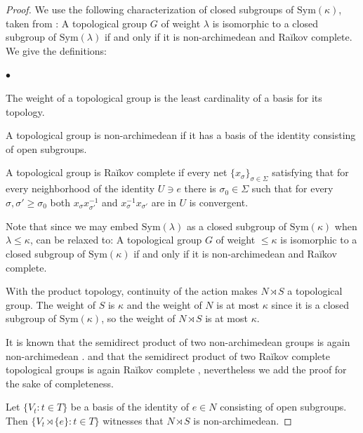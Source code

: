 \documentclass[10pt,a4paper]{amsart}
\theoremstyle{plain}
\theoremstyle{definition}
\begin{document}
\begin{proof}
    We use the following characterization of closed subgroups of $\mathrm{Sym}(\kappa)$, taken from \cite[Corollary 4.9]{ClosedofSym}: A topological group $G$ of weight $\lambda$ is isomorphic to a closed subgroup of $\mathrm{Sym}(\lambda)$ if and only if it is non-archimedean and Ra\u{i}kov complete. We give the definitions:
    \begin{list}{$\bullet$}{}
        \item The weight of a topological group is the least cardinality of a basis for its topology.
        \item A topological group is non-archimedean if it has a basis of the identity consisting of open subgroups.
        \item A topological group is Ra\u{i}kov complete if every net $\{x_\sigma\}_{\sigma\in \Sigma}$ satisfying that for every neighborhood of the identity $U\ni e$ there is $\sigma_0\in \Sigma$ such that for every $\sigma,\sigma'\geq \sigma_0$ both $x_\sigma x_{\sigma'}^{-1}$ and $x_{\sigma}^{-1}x_{\sigma'}$ are in $U$ is convergent.
    \end{list}

    Note that since we may embed $\mathrm{Sym}(\lambda)$ as a closed subgroup of $\mathrm{Sym}(\kappa)$ when $\lambda\leq \kappa$, \cite[Corollary 4.9]{ClosedofSym} can be relaxed to: A topological group $G$ of weight $\leq \kappa$ is isomorphic to a closed subgroup of $\mathrm{Sym}(\kappa)$ if and only if it is non-archimedean and Ra\u{i}kov complete.

    With the product topology, continuity of the action makes $N\rtimes S$ a topological group. 
    The weight of $S$ is $\kappa$ and the weight of $N$ is at most $\kappa$ since it is a closed subgroup of $\mathrm{Sym}(\kappa)$, so the weight of $N\rtimes S$ is at most $\kappa$.

    It is known that the semidirect product of two non-archimedean groups is again non-archimedean \cite[Corollary 3.4]{MeSh}. and that the semidirect product of two Ra\u{i}kov complete topological groups is again Ra\u{i}kov complete \cite[Theorems 12,17]{raikov}, nevertheless we add the proof for the sake of completeness.

    Let $\{V_t:t\in T\}$ be a basis of the identity of $e\in N$ consisting of open subgroups. Then $\{V_t\rtimes \{e\}:t\in T\}$ witnesses that $N\rtimes S$ is non-archimedean.
    

\end{proof}
\end{document}
